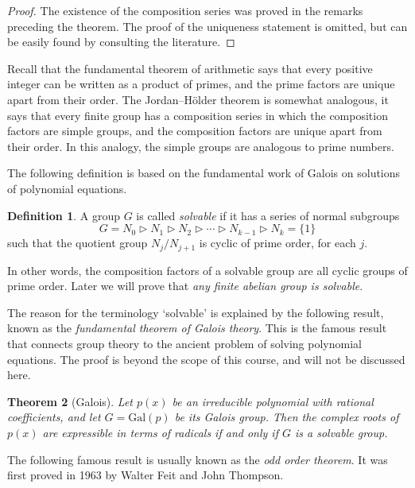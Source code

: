 \documentclass[11pt,oneside]{article}
\newtheorem{thm}{Theorem}[section]
\theoremstyle{definition}
\newtheorem{defn}[thm]{Definition}
\newcommand{\morenormal}{\triangleright}
\begin{document}
\begin{proof} The existence of the composition series was proved in the
remarks preceding the theorem. The proof of the uniqueness statement
is omitted, but can be easily found by consulting the literature.
\end{proof}

Recall that the fundamental theorem of arithmetic says that every
positive integer can be written as a product of primes, and the prime
factors are unique apart from their order. The Jordan--H\"{o}lder
theorem is somewhat analogous, it says that every finite group has a
composition series in which the composition factors are simple groups,
and the composition factors are unique apart from their order. In this
analogy, the simple groups are analogous to prime numbers.

The following definition is based on the fundamental work of Galois on
solutions of polynomial equations.

\begin{defn}
A group $G$ is called {\em solvable} if it has a series of normal
subgroups
\[
G = N_0 \morenormal N_1 \morenormal N_2 \morenormal \cdots \morenormal
N_{k-1} \morenormal N_k = \{1\}
\] 
such that the quotient group $N_j/N_{j+1}$ is cyclic of prime order,
for each $j$.
\end{defn}

In other words, the composition factors of a solvable group are all
cyclic groups of prime order. Later we will prove that \emph{any
  finite abelian group is solvable}.


The reason for the terminology `solvable' is explained by the
following result, known as the \emph{fundamental theorem of Galois
  theory}. This is the famous result that connects group theory to the
ancient problem of solving polynomial equations. The proof is beyond
the scope of this course, and will not be discussed here.



\begin{thm}[Galois]
Let $p(x)$ be an irreducible polynomial with rational coefficients,
and let $G = \mathrm{Gal}(p)$ be its Galois group. Then the complex
roots of $p(x)$ are expressible in terms of radicals if and only if
$G$ is a solvable group.
\end{thm}




The following famous result is usually known as the \emph{odd order
  theorem}. It was first proved in 1963 by Walter Feit and John
Thompson.
\end{document}
